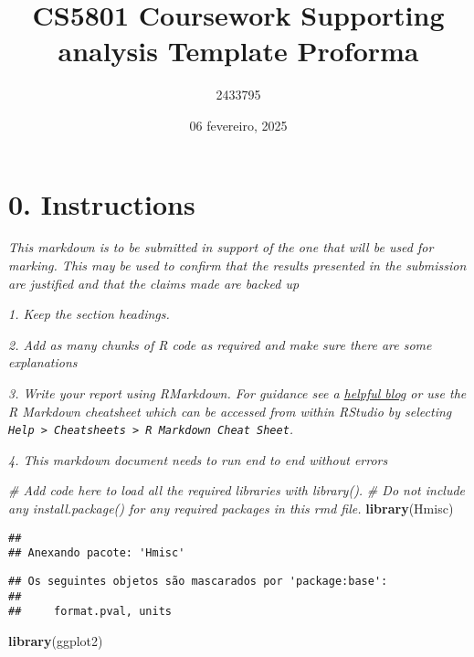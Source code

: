 \documentclass[
]{article}
\title{CS5801 Coursework Supporting analysis Template Proforma}
\author{2433795}
\date{06 fevereiro, 2025}
\newenvironment{Shaded}{\begin{snugshade}}{\end{snugshade}}
\newcommand{\CommentTok}[1]{\textcolor[rgb]{0.56,0.35,0.01}{\textit{#1}}}
\newcommand{\FunctionTok}[1]{\textcolor[rgb]{0.13,0.29,0.53}{\textbf{#1}}}
\newcommand{\NormalTok}[1]{#1}
\begin{document}
\maketitle

\section{0. Instructions}\label{instructions}

\emph{This markdown is to be submitted in support of the one that will
be used for marking. This may be used to confirm that the results
presented in the submission are justified and that the claims made are
backed up}

\emph{1. Keep the section headings.}

\emph{2. Add as many chunks of R code as required and make sure there
are some explanations}

\emph{3. Write your report using RMarkdown. For guidance see a
\href{https://www.dataquest.io/blog/r-markdown-guide-cheatsheet/\#tve-jump-17333da0719}{helpful
blog} or use the R Markdown cheatsheet which can be accessed from within
RStudio by selecting
\texttt{Help\ \textgreater{}\ Cheatsheets\ \textgreater{}\ R\ Markdown\ Cheat\ Sheet}.}

\emph{4. This markdown document needs to run end to end without errors}

\begin{Shaded}
\begin{Highlighting}[]
\CommentTok{\# Add code here to load all the required libraries with \textasciigrave{}library()\textasciigrave{}.  }
\CommentTok{\# Do not include any \textasciigrave{}install.package()\textasciigrave{} for any required packages in this rmd file.}
\FunctionTok{library}\NormalTok{(Hmisc)}
\end{Highlighting}
\end{Shaded}

\begin{verbatim}
## 
## Anexando pacote: 'Hmisc'
\end{verbatim}

\begin{verbatim}
## Os seguintes objetos são mascarados por 'package:base':
## 
##     format.pval, units
\end{verbatim}

\begin{Shaded}
\begin{Highlighting}[]
\FunctionTok{library}\NormalTok{(ggplot2)}
\end{Highlighting}
\end{Shaded}
\end{document}
